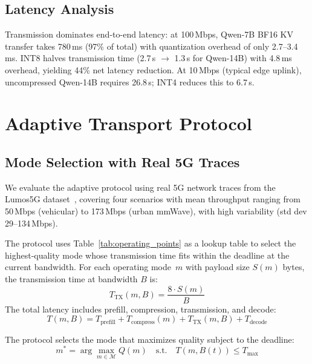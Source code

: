 \documentclass[journal]{IEEEtran}
\begin{document}
\subsection{Latency Analysis}

Transmission dominates end-to-end latency: at 100\,Mbps, Qwen-7B BF16 KV transfer takes 780\,ms (97\% of total) with quantization overhead of only 2.7--3.4\,ms.
INT8 halves transmission time (2.7\,s $\to$ 1.3\,s for Qwen-14B) with 4.8\,ms overhead, yielding 44\% net latency reduction.
At 10\,Mbps (typical edge uplink), uncompressed Qwen-14B requires 26.8\,s; INT4 reduces this to 6.7\,s.


\section{Adaptive Transport Protocol}
\label{sec:transport}

\subsection{Mode Selection with Real 5G Traces}

We evaluate the adaptive protocol using real 5G network traces from the Lumos5G dataset~\cite{lumos5g}, covering four scenarios with mean throughput ranging from 50\,Mbps (vehicular) to 173\,Mbps (urban mmWave), with high variability (std dev 29--134\,Mbps).

The protocol uses Table~\ref{tab:operating_points} as a lookup table to select the highest-quality mode whose transmission time fits within the deadline at the current bandwidth.
For each operating mode~$m$ with payload size $S(m)$ bytes, the transmission time at bandwidth $B$ is:
\begin{equation}
    T_{\text{TX}}(m, B) = \frac{8 \cdot S(m)}{B}
    \label{eq:tx_time}
\end{equation}
The total latency includes prefill, compression, transmission, and decode:
\begin{equation}
    T(m, B) = T_{\text{prefill}} + T_{\text{compress}}(m) + T_{\text{TX}}(m, B) + T_{\text{decode}}
\end{equation}

The protocol selects the mode that maximizes quality subject to the deadline:
\begin{equation}
    m^* = \arg\max_{m \in \mathcal{M}} Q(m) \quad \text{s.t.} \quad T(m, B(t)) \leq T_{\max}
\end{equation}
\end{document}
